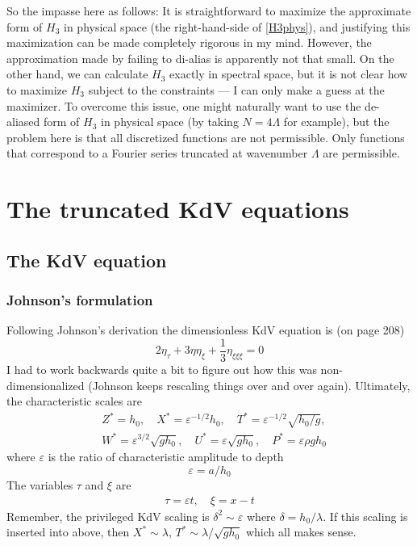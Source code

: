 \documentclass[12pt]{article}
\newcommand{\np}{\newpage \noindent}
\newcommand{\eps}{\varepsilon}
\begin{document}
So the impasse here as follows: It is straightforward to maximize the approximate form of $H_3$ in physical space (the right-hand-side of \eqref{H3phys}), and justifying this maximization can be made completely rigorous in my mind. However, the approximation made by failing to di-alias is apparently not that small. On the other hand, we can calculate $H_3$ exactly in spectral space, but it is not clear how to maximize $H_3$ subject to the constraints --- I can only make a guess at the maximizer. To overcome this issue, one might naturally want to use the de-aliased form of $H_3$ in physical space (by taking $N = 4 \Lambda$ for example), but the problem here is that all discretized functions are not permissible. Only functions that correspond to a Fourier series truncated at wavenumber $\Lambda$ are permissible.


\np
\section{The truncated KdV equations}

\subsection{The KdV equation}

\subsubsection{Johnson's formulation}
Following Johnson's derivation the dimensionless KdV equation is (on page 208)
\begin{equation}
2 \eta_{\tau} + 3 \eta \eta_{\xi} + \frac{1}{3} \eta_{\xi \xi \xi} = 0
\end{equation}
I had to work backwards quite a bit to figure out how this was non-dimensionalized (Johnson keeps rescaling things over and over again). Ultimately, the characteristic scales are
\begin{align}
& Z^* = h_0 , \quad X^* = \eps^{-1/2} h_0 , \quad T^* = \eps^{-1/2} \sqrt{h_0/g} , \\
& W^* = \eps^{3/2} \sqrt{g h_0} , \quad U^* = \eps \sqrt{g h_0} , \quad P^* = \eps \rho g h_0
\end{align}
where $\eps$ is the ratio of characteristic amplitude to depth
\begin{equation}
\eps = a / h_0
\end{equation}
The variables $\tau$ and $\xi$ are
\begin{align}
\tau = \eps t , \quad \xi = x-t
\end{align}
Remember, the privileged KdV scaling is $\delta^2 \sim \eps$ where $\delta = h_0 / \lambda$. If this scaling is inserted into above, then $X^* \sim \lambda$, $T^* \sim \lambda/\sqrt{g h_0}$ which all makes sense.
\end{document}
